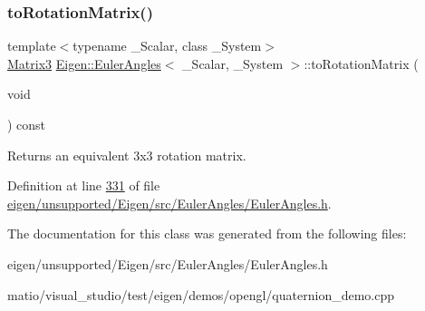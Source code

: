 \subsubsection{\texorpdfstring{to\+Rotation\+Matrix()}{toRotationMatrix()}\hspace{0.1cm}{\footnotesize\ttfamily [2/2]}}
{\footnotesize\ttfamily template$<$typename \+\_\+\+Scalar, class \+\_\+\+System$>$ \\
\hyperlink{class_eigen_1_1_euler_angles_ad0f0ee8240849b0f7d028695849cdbad}{Matrix3} \hyperlink{class_eigen_1_1_euler_angles}{Eigen\+::\+Euler\+Angles}$<$ \+\_\+\+Scalar, \+\_\+\+System $>$\+::to\+Rotation\+Matrix (\begin{DoxyParamCaption}\item[{void}]{ }\end{DoxyParamCaption}) const\hspace{0.3cm}{\ttfamily [inline]}}

\begin{DoxyReturn}{Returns}
an equivalent 3x3 rotation matrix. 
\end{DoxyReturn}


Definition at line \hyperlink{eigen_2unsupported_2_eigen_2src_2_euler_angles_2_euler_angles_8h_source_l00331}{331} of file \hyperlink{eigen_2unsupported_2_eigen_2src_2_euler_angles_2_euler_angles_8h_source}{eigen/unsupported/\+Eigen/src/\+Euler\+Angles/\+Euler\+Angles.\+h}.



The documentation for this class was generated from the following files\+:\begin{DoxyCompactItemize}
\item 
eigen/unsupported/\+Eigen/src/\+Euler\+Angles/\+Euler\+Angles.\+h\item 
matio/visual\+\_\+studio/test/eigen/demos/opengl/quaternion\+\_\+demo.\+cpp\end{DoxyCompactItemize}
